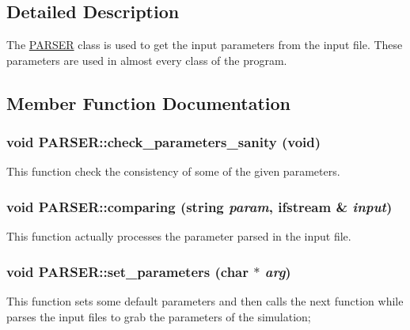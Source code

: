 \subsection{Detailed Description}
The \hyperlink{classPARSER}{PARSER} class is used to get the input parameters from the input file. These parameters are used in almost every class of the program. 

\subsection{Member Function Documentation}
\hypertarget{classPARSER_a3ae5ce3223fefb960976fe4bbe9083f5}{
\subsubsection[{check\_\-parameters\_\-sanity}]{\setlength{\rightskip}{0pt plus 5cm}void PARSER::check\_\-parameters\_\-sanity (void)}}
\label{classPARSER_a3ae5ce3223fefb960976fe4bbe9083f5}
This function check the consistency of some of the given parameters. \hypertarget{classPARSER_aa33f0f4b7870aa1f5e9bf9e67bc648fa}{
\subsubsection[{comparing}]{\setlength{\rightskip}{0pt plus 5cm}void PARSER::comparing (string {\em param}, \/  ifstream \& {\em input})}}
\label{classPARSER_aa33f0f4b7870aa1f5e9bf9e67bc648fa}
This function actually processes the parameter parsed in the input file. \hypertarget{classPARSER_a4153cc523f4a054e7c488c4fe25b9fa1}{
\subsubsection[{set\_\-parameters}]{\setlength{\rightskip}{0pt plus 5cm}void PARSER::set\_\-parameters (char $\ast$ {\em arg})}}
\label{classPARSER_a4153cc523f4a054e7c488c4fe25b9fa1}
This function sets some default parameters and then calls the next function while parses the input files to grab the parameters of the simulation; 

